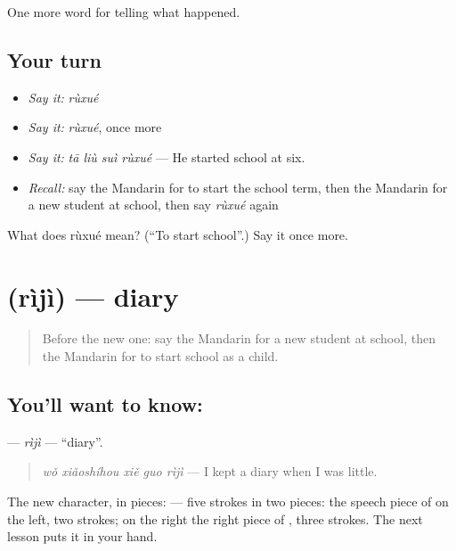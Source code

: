 \begin{grammarlens}[title={What you've built}]
One more word for telling what happened.
\end{grammarlens}

\subsection*{Your turn}
\begin{itemize}
\raggedright
  \item \emph{Say it:} \emph{rùxué}
  \item \emph{Say it:} \emph{rùxué}, once more
  \item \emph{Say it:} \emph{tā liù suì rùxué} — He started school at six.
  \item \emph{Recall:} say the Mandarin for to start the school term, then the Mandarin for a new student at school, then say \emph{rùxué} again
\end{itemize}

\begin{tcolorbox}[breakable,colback=teal!4,colframe=teal!35!black,title={Before you move on}]
What does rùxué mean? (\textquotedblleft{}To start school\textquotedblright{}.) Say it once more.
\end{tcolorbox}
\section[\texorpdfstring{\zh{日记} (rìjì)}{日记 (rìjì)}]{ (rìjì) — diary}

\label{lesson:ZH-C304-riji}



\begin{quote}
Before the new one: say the Mandarin for a new student at school, then the Mandarin for to start school as a child.
\end{quote}

\subsection*{You'll want to know: }
\textbf{} — \emph{rìjì} — \textquotedblleft{}diary\textquotedblright{}.

\begin{quote}
\textbf{} \emph{wǒ xiǎoshíhou xiě guo rìjì} — I kept a diary when I was little.
\end{quote}

The new character, in pieces:  — five strokes in two pieces: the speech piece of  on the left, two strokes; on the right the right piece of , three strokes. The next lesson puts it in your hand.

